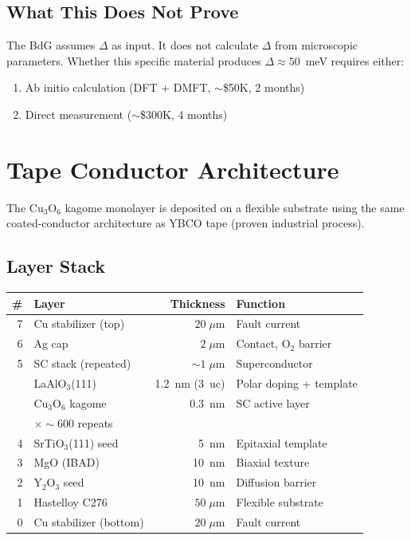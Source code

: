 \documentclass[11pt, a4paper]{article}
\begin{document}
\subsection{What This Does Not Prove}

The BdG assumes $\Delta$ as input. It does not calculate $\Delta$
from microscopic parameters. Whether this specific material
produces $\Delta \approx 50$~meV requires either:
\begin{enumerate}[nosep]
  \item Ab initio calculation (DFT + DMFT, $\sim$\$50K, 2 months)
  \item Direct measurement ($\sim$\$300K, 4 months)
\end{enumerate}

\section{Tape Conductor Architecture}

The Cu$_3$O$_6$ kagome monolayer is deposited on a flexible
substrate using the same coated-conductor architecture as YBCO
tape (proven industrial process).

\subsection{Layer Stack}

\begin{center}
\begin{tabular}{@{}rp{5cm}rl@{}}
\toprule
\textbf{\#} & \textbf{Layer} & \textbf{Thickness} & \textbf{Function} \\
\midrule
7 & Cu stabilizer (top) & $20\;\mu$m & Fault current \\
6 & Ag cap & $2\;\mu$m & Contact, O$_2$ barrier \\
5 & SC stack (repeated) & $\sim 1\;\mu$m & Superconductor \\
  & \quad LaAlO$_3$(111) & 1.2~nm (3~uc) & Polar doping + template \\
  & \quad Cu$_3$O$_6$ kagome & 0.3~nm & SC active layer \\
  & \quad $\times \sim 600$ repeats & & \\
4 & SrTiO$_3$(111) seed & 5~nm & Epitaxial template \\
3 & MgO (IBAD) & 10~nm & Biaxial texture \\
2 & Y$_2$O$_3$ seed & 10~nm & Diffusion barrier \\
1 & Hastelloy C276 & $50\;\mu$m & Flexible substrate \\
0 & Cu stabilizer (bottom) & $20\;\mu$m & Fault current \\
\bottomrule
\end{tabular}
\end{center}
\end{document}

